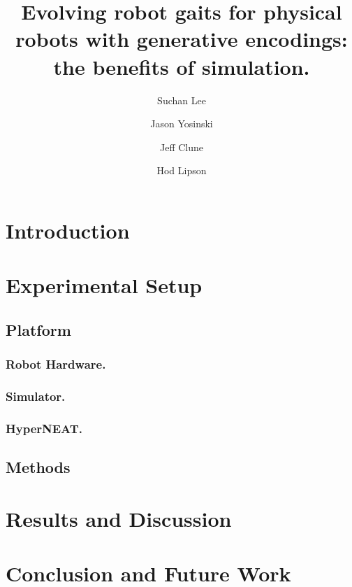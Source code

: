 \documentclass{llncs}
\begin{document}
%
\title{Evolving robot gaits for physical robots with generative encodings: the benefits of simulation.}

\author{Suchan Lee \and Jason Yosinski \and Jeff Clune \and Hod Lipson}
\maketitle
%
%
%
%
\begin{abstract}

\end{abstract}
%
%
\section{Introduction}

%
%
\section{Experimental Setup}
\subsection{Platform}
\subsubsection{Robot Hardware.}

\subsubsection{Simulator.}

\subsubsection{HyperNEAT.}

\subsection{Methods}

%
%
\section{Results and Discussion}

%
%
\section{Conclusion and Future Work}

%
%

%
\footnotesize


%
%
\end{document}
